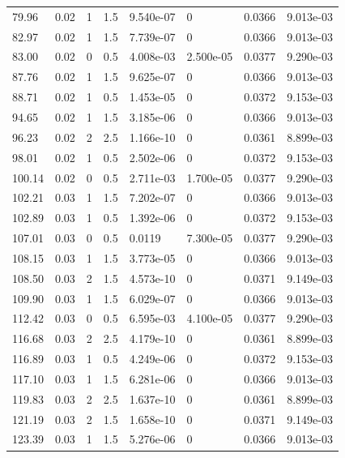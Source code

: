 \documentclass[preview]{standalone}
\begin{document}
{{\begin{tabular}{L{1.2cm}C{1.2cm} C{0.3cm}C{0.5cm} C{1.4cm}C{1.4cm} C{1.4cm}C{1.4cm}}
  79.96  &  0.02  & 1     & 1.5 &  9.540e-07  & 0  & 0.0366 &  9.013e-03   \\ 
  82.97  &  0.02  & 1     & 1.5 &  7.739e-07  & 0  & 0.0366 &  9.013e-03   \\ 
  83.00  &  0.02  & 0     & 0.5 &  4.008e-03  & 2.500e-05  & 0.0377 &  9.290e-03   \\ 
  87.76  &  0.02  & 1     & 1.5 &  9.625e-07  & 0  & 0.0366 &  9.013e-03   \\ 
  88.71  &  0.02  & 1     & 0.5 &  1.453e-05  & 0  & 0.0372 &  9.153e-03   \\ 
  94.65  &  0.02  & 1     & 1.5 &  3.185e-06  & 0  & 0.0366 &  9.013e-03   \\ 
  96.23  &  0.02  & 2     & 2.5 &  1.166e-10  & 0  & 0.0361 &  8.899e-03   \\ 
  98.01  &  0.02  & 1     & 0.5 &  2.502e-06  & 0  & 0.0372 &  9.153e-03   \\ 
  100.14  &  0.02  & 0     & 0.5 &  2.711e-03  & 1.700e-05  & 0.0377 &  9.290e-03   \\ 
  102.21  &  0.03  & 1     & 1.5 &  7.202e-07  & 0  & 0.0366 &  9.013e-03   \\ 
  102.89  &  0.03  & 1     & 0.5 &  1.392e-06  & 0  & 0.0372 &  9.153e-03   \\ 
  107.01  &  0.03  & 0     & 0.5 &  0.0119  & 7.300e-05  & 0.0377 &  9.290e-03   \\ 
  108.15  &  0.03  & 1     & 1.5 &  3.773e-05  & 0  & 0.0366 &  9.013e-03   \\ 
  108.50  &  0.03  & 2     & 1.5 &  4.573e-10  & 0  & 0.0371 &  9.149e-03   \\ 
  109.90  &  0.03  & 1     & 1.5 &  6.029e-07  & 0  & 0.0366 &  9.013e-03   \\ 
  112.42  &  0.03  & 0     & 0.5 &  6.595e-03  & 4.100e-05  & 0.0377 &  9.290e-03   \\ 
  116.68  &  0.03  & 2     & 2.5 &  4.179e-10  & 0  & 0.0361 &  8.899e-03   \\ 
  116.89  &  0.03  & 1     & 0.5 &  4.249e-06  & 0  & 0.0372 &  9.153e-03   \\ 
  117.10  &  0.03  & 1     & 1.5 &  6.281e-06  & 0  & 0.0366 &  9.013e-03   \\ 
  119.83  &  0.03  & 2     & 2.5 &  1.637e-10  & 0  & 0.0361 &  8.899e-03   \\ 
  121.19  &  0.03  & 2     & 1.5 &  1.658e-10  & 0  & 0.0371 &  9.149e-03   \\ 
  123.39  &  0.03  & 1     & 1.5 &  5.276e-06  & 0  & 0.0366 &  9.013e-03   \\ 

\end{tabular}}}
\end{document}
